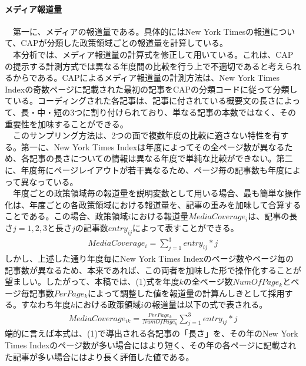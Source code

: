 \documentclass[here]{article}
\begin{document}
\paragraph*{メディア報道量}
　第一に、メディアの報道量である。具体的にはNew York Timesの報道について、CAPが分類した政策領域ごとの報道量を計算している。\\
　本分析では、メディア報道量の計算式を修正して用いている。これは、CAPの提示する計測方式では異なる年度間の比較を行う上で不適切であると考えられるからである。CAPによるメディア報道量の計測方法は、New York Times Indexの奇数ページに記載された最初の記事をCAPの分類コードに従って分類している。コーディングされた各記事は、記事に付されている概要文の長さによって、長・中・短の3つに割り付けられており、単なる記事の本数ではなく、その重要性を加味することができる。\\
　このサンプリング方法は、2つの面で複数年度の比較に適さない特性を有する。第一に、New York Times Indexは年度によってその全ページ数が異なるため、各記事の長さについての情報は異なる年度で単純な比較ができない。第二に、年度毎にページレイアウトが若干異なるため、ページ毎の記事数も年度によって異なっている。\\
　年度ごとの政策領域毎の報道量を説明変数として用いる場合、最も簡単な操作化は、年度ごとの各政策領域における報道量を、記事の重みを加味して合算することである。この場合、政策領域$i$における報道量$MediaCoverage_i$は、記事の長さ$j = 1,2,3$と長さ$j$の記事数$entry_{ij}$によって表すことができる。\\
\begin{align}
  MediaCoverage_i =  \sum_{j=1}^3 entry_{ij}*j
\end{align}
しかし、上述した通り年度毎にNew York Times Indexのページ数やページ毎の記事数が異なるため、本来であれば、この両者を加味した形で操作化することが望ましい。したがって、本稿では、(1)式を年度$k$の全ページ数$NumOfPage_k$とページ毎記事数$PerPage_k$によって調整した値を報道量の計算んしきとして採用する。すなわち年度$k$における政策領域$i$の報道量は以下の式で表される。\\
\begin{align}
  MediaCoverage_{ik} = \frac{PerPage_k}{NumOfPage_k} \sum_{j=1}^3 entry_{ij}*j
\end{align}
端的に言えば本式は、(1)で導出される各記事の「長さ」を、その年のNew York Times Indexのページ数が多い場合にはより短く、その年の各ページに記載された記事が多い場合にはより長く評価した値である。
\end{document}
